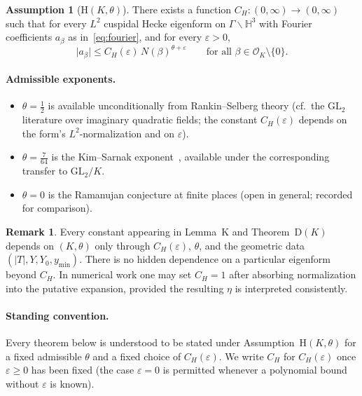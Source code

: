 \documentclass[11pt]{amsart}
\theoremstyle{definition}
\newtheorem{assumption}[theorem]{Assumption}
\newtheorem{remark}[theorem]{Remark}
\newcommand{\HH}{\mathbb{H}^3}
\newcommand{\OK}{\mathcal{O}_K}
\newcommand{\abs}[1]{\lvert#1\rvert}
\newcommand{\eps}{\varepsilon}
\newcommand{\tht}{\theta}
\begin{document}
\begin{assumption}[H$(K,\tht)$]
\label{ass:H}
There exists a function $C_H:(0,\infty)\to(0,\infty)$ such that for every
$L^2$ cuspidal Hecke eigenform on $\Gamma\backslash\HH$ with Fourier
coefficients $a_\beta$ as in~\eqref{eq:fourier}, and for every
$\eps>0$,
\begin{equation}
\label{eq:H}
  \abs{a_\beta}
  \le
  C_H(\eps)\,
  N(\beta)^{\tht+\eps}
  \qquad\text{for all }\beta\in\OK\setminus\{0\}.
\end{equation}
\end{assumption}

\paragraph{Admissible exponents.}
\begin{itemize}[leftmargin=*]
\item $\tht=\tfrac12$ is available unconditionally from Rankin--Selberg
theory (cf.\ the $\mathrm{GL}_2$ literature over imaginary quadratic
fields; the constant $C_H(\eps)$ depends on the form's $L^2$-normalization
and on $\eps$).
\item $\tht=\tfrac7{64}$ is the Kim--Sarnak exponent~\cite{KS}, available
under the corresponding transfer to $\mathrm{GL}_2/K$.
\item $\tht=0$ is the Ramanujan conjecture at finite places (open in
general; recorded for comparison).
\end{itemize}

\begin{remark}
\label{rem:Hecke-entry}
Every constant appearing in Lemma~K and Theorem~D$(K)$ depends on
$(K,\tht)$ only through $C_H(\eps)$, $\tht$, and the geometric data
$(\abs{T},Y,Y_0,y_{\min})$.  There is no hidden dependence on a particular
eigenform beyond $C_H$.  In numerical work one may set $C_H=1$ after
absorbing normalization into the putative expansion, provided the
resulting $\eta$ is interpreted consistently.
\end{remark}

\paragraph{Standing convention.}
Every theorem below is understood to be stated under Assumption~H$(K,\tht)$
for a fixed admissible $\tht$ and a fixed choice of $C_H(\eps)$.  We write
$C_H$ for $C_H(\eps)$ once $\eps\ge 0$ has been fixed (the case $\eps=0$
is permitted whenever a polynomial bound without $\eps$ is known).
\end{document}
